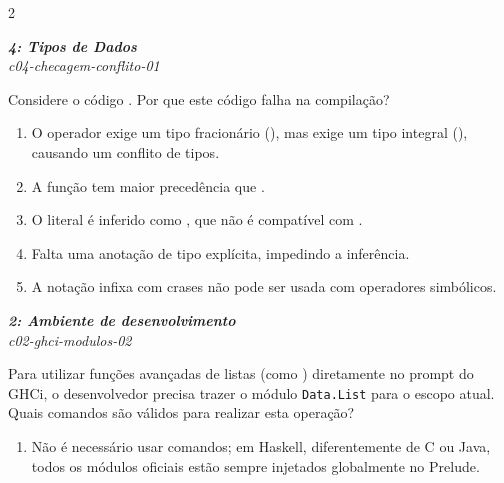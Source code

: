 \documentclass[a4paper,10pt,brazil]{article}
\begin{document}
\begin{multicols}{2}
\begin{enumerate}
\end{enumerate}

\begin{flushright}
  \footnotesize
  \textit{\textbf{4: Tipos de Dados}}\\
  \textit{c04-checagem-conflito-01}\\

\end{flushright}
Considere o código . Por que este código falha na compilação?

\begin{enumerate}
  \item O operador \haskellinline{/} exige um tipo fracionário (), mas  exige um tipo integral (), causando um conflito de tipos.

  \item A função  tem maior precedência que \haskellinline{/}.

  \item O literal  é inferido como , que não é compatível com .

  \item Falta uma anotação de tipo explícita, impedindo a inferência.

  \item A notação infixa com crases não pode ser usada com operadores simbólicos.


\end{enumerate}

\begin{flushright}
  \footnotesize
  \textit{\textbf{2: Ambiente de desenvolvimento}}\\
  \textit{c02-ghci-modulos-02}\\

\end{flushright}
Para utilizar funções avançadas de listas (como ) diretamente no prompt do GHCi, o desenvolvedor precisa trazer o módulo \texttt{Data.List} para o escopo atual. Quais comandos são válidos para realizar esta operação?

\begin{enumerate}
  \item Não é necessário usar comandos; em Haskell, diferentemente de C ou Java, todos os módulos oficiais estão sempre injetados globalmente no Prelude.


\end{enumerate}
\end{multicols}
\end{document}
